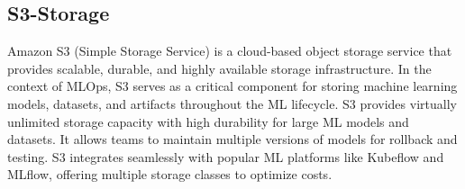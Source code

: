 \subsection{S3-Storage}
Amazon S3 (Simple Storage Service) is a cloud-based object storage service that provides scalable, durable, and highly available storage infrastructure.
In the context of MLOps\cite{10.1145/3533378}, S3 serves as a critical component for storing machine learning models, datasets, and artifacts throughout the ML lifecycle.
S3 provides virtually unlimited storage capacity with high durability for large ML models and datasets.
It allows teams to maintain multiple versions of models for rollback and testing.
S3 integrates seamlessly with popular ML platforms like Kubeflow and MLflow, offering multiple storage classes to optimize costs\cite{10.1145/3533378}.